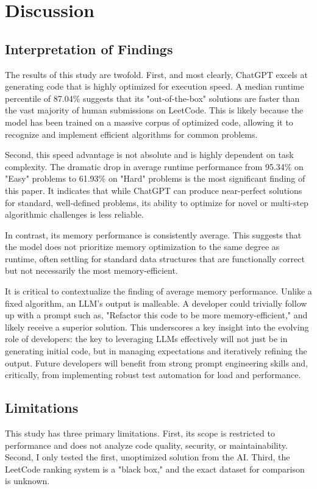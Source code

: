 \documentclass[12pt, a4paper]{article}
\begin{document}
\section{Discussion}

\subsection{Interpretation of Findings}
The results of this study are twofold. First, and most clearly, ChatGPT excels at generating code that is highly optimized for execution speed. A median runtime percentile of 87.04\% suggests that its "out-of-the-box" solutions are faster than the vast majority of human submissions on LeetCode. This is likely because the model has been trained on a massive corpus of optimized code, allowing it to recognize and implement efficient algorithms for common problems.

Second, this speed advantage is not absolute and is highly dependent on task complexity. The dramatic drop in average runtime performance from 95.34\% on "Easy" problems to 61.93\% on "Hard" problems is the most significant finding of this paper. It indicates that while ChatGPT can produce near-perfect solutions for standard, well-defined problems, its ability to optimize for novel or multi-step algorithmic challenges is less reliable.

In contrast, its memory performance is consistently average. This suggests that the model does not prioritize memory optimization to the same degree as runtime, often settling for standard data structures that are functionally correct but not necessarily the most memory-efficient.

It is critical to contextualize the finding of average memory performance. Unlike a fixed algorithm, an LLM's output is malleable. A developer could trivially follow up with a prompt such as, "Refactor this code to be more memory-efficient," and likely receive a superior solution. This underscores a key insight into the evolving role of developers: the key to leveraging LLMs effectively will not just be in generating initial code, but in managing expectations and iteratively refining the output. Future developers will benefit from strong prompt engineering skills and, critically, from implementing robust test automation for load and performance.

\subsection{Limitations}
This study has three primary limitations. First, its scope is restricted to performance and does not analyze code quality, security, or maintainability. Second, I only tested the first, unoptimized solution from the AI. Third, the LeetCode ranking system is a "black box," and the exact dataset for comparison is unknown.
\end{document}

